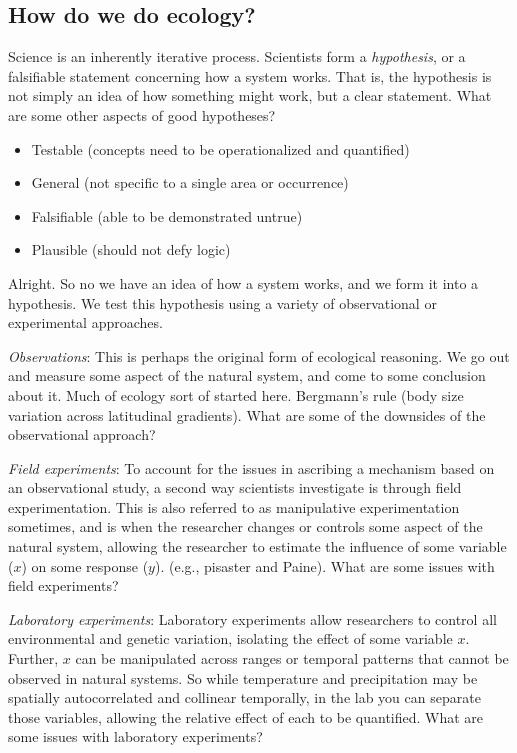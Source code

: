 \documentclass[12pt]{article}
\begin{document}
\subsection*{How do we do ecology?}

Science is an inherently iterative process. Scientists form a \textit{hypothesis}, or a falsifiable statement concerning how a system works. That is, the hypothesis is not simply an idea of how something might work, but a clear statement. What are some other aspects of good hypotheses?
\begin{itemize}

  \item Testable (concepts need to be operationalized and quantified)
  \item General (not specific to a single area or occurrence)
  \item Falsifiable (able to be demonstrated untrue)
  \item Plausible (should not defy logic)

\end{itemize}



Alright. So no we have an idea of how a system works, and we form it into a hypothesis. We test this hypothesis using a variety of observational or experimental approaches. 








\textit{Observations}: This is perhaps the original form of ecological reasoning. We go out and measure some aspect of the natural system, and come to some conclusion about it. Much of ecology sort of started here. Bergmann's rule (body size variation across latitudinal gradients). What are some of the downsides of the observational approach?




\textit{Field experiments}: To account for the issues in ascribing a mechanism based on an observational study, a second way scientists investigate is through field experimentation. This is also referred to as manipulative experimentation sometimes, and is when the researcher changes or controls some aspect of the natural system, allowing the researcher to estimate the influence of some variable ($x$) on some response ($y$). (e.g., pisaster and Paine). What are some issues with field experiments?





\textit{Laboratory experiments}: Laboratory experiments allow researchers to control all environmental and genetic variation, isolating the effect of some variable $x$. Further, $x$ can be manipulated across ranges or temporal patterns that cannot be observed in natural systems. So while temperature and precipitation may be spatially autocorrelated and collinear temporally, in the lab you can separate those variables, allowing the relative effect of each to be quantified. What are some issues with laboratory experiments?
\end{document}
